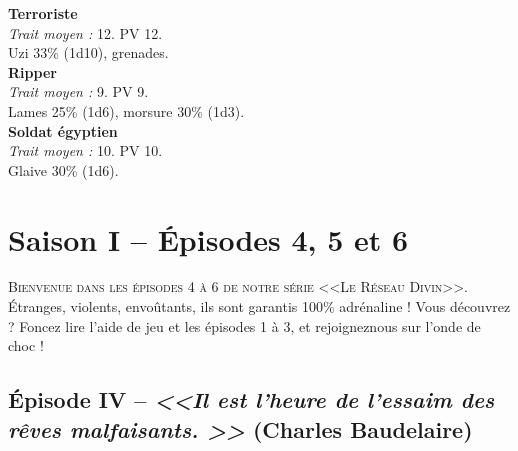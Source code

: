 \documentclass[11pt,twoside,a4paper]{book}
\begin{document}
\textbf{Terroriste}~\\
\emph{Trait moyen : }12. PV 12.~\\
Uzi 33\% (1d10), grenades.~\\

\textbf{Ripper}~\\
\emph{Trait moyen : }9. PV 9.~\\
Lames 25\% (1d6), morsure 30\% (1d3).~\\

\textbf{Soldat {\'e}gyptien}~\\
\emph{Trait moyen : }10. PV 10.~\\
Glaive 30\% (1d6).

\clearpage


\chapter*{Saison I -- {\'E}pisodes 4, 5 et 6}

\lettrine{B}{ienvenue dans les {\'e}pisodes 4 {\`a} 6 de notre s{\'e}rie <<Le R{\'e}seau Divin>>. }{\'E}tranges, violents, envo{\^u}tants, ils sont garantis 100\% adr{\'e}naline ! Vous d{\'e}couvrez ? Foncez lire l'aide de jeu et les {\'e}pisodes 1 {\`a} 3, et rejoigneznous sur l'onde de choc !~\\

\section*{{\'E}pisode IV -- \emph{<<\textbf{Il est l'heure de l'essaim des r{\^e}ves malfaisants. }>>} (Charles Baudelaire)}

\end{document}
